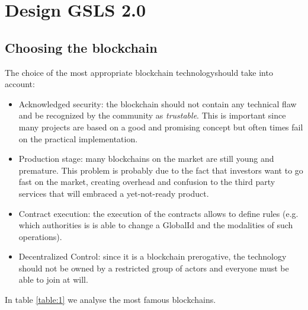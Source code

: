 
\section{Design GSLS 2.0}

\subsection{Choosing the blockchain}
The choice of the most appropriate blockchain technologyshould take into account:

\begin{itemize}
  \item Acknowledged security: the blockchain should not contain any technical flaw and be recognized by the community as \textit{trustable}. This is important since many projects are based on a good and promising concept but often times fail on the practical implementation.
  \item Production stage: many blockchains on the market are still young and premature. This problem is probably due to the fact that investors want to go fast on the market, creating overhead and confusion to the third party services that will embraced a yet-not-ready product.
  \item Contract execution: the execution of the contracts allows to define rules (e.g. which authorities is is able to change a GlobalId and the modalities of such operations).
  \item Decentralized Control: since it is a blockchain prerogative, the technology should not be owned by a restricted group of actors and everyone must be able to join at will.
\end{itemize}

In table \ref{table:1} we analyse the most famous blockchains.

